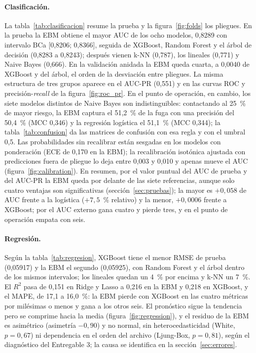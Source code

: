 \paragraph{Clasificación.}
La tabla~\ref{tab:clasificacion} resume la prueba y la figura~\ref{fig:folds} los pliegues. En la prueba la EBM
obtiene el mayor AUC de los ocho modelos, 0,8289 con intervalo BCa [0,8206; 0,8366], seguida de XGBoost,
Random Forest y el árbol de decisión (0,8283 a 0,8243); después vienen k-NN (0,787), los lineales (0,771) y
Naive Bayes (0,666). En la validación anidada la EBM queda cuarta, a 0,0040 de XGBoost y del árbol, el orden
de la desviación entre pliegues. La misma estructura de tres grupos aparece en el AUC-PR (0,551) y en las
curvas ROC y precisión-\emph{recall} de la
figura~\ref{fig:roc_pr}. En el
punto de operación, en cambio, los siete modelos distintos de Naive Bayes son indistinguibles: contactando al
25~\% de mayor riesgo, la EBM captura el 51,2~\% de la fuga con una precisión del 50,4~\% (MCC 0,346) y la
regresión logística el 51,1~\% (MCC 0,344); la tabla~\ref{tab:confusion} da las matrices de confusión con esa
regla y con el umbral 0,5. Las probabilidades sin
recalibrar están sesgadas en los modelos con ponderación (ECE de 0,170 en la EBM); la recalibración isotónica
ajustada con predicciones fuera de pliegue lo deja entre 0,003 y 0,010 y apenas mueve el AUC
(figura~\ref{fig:calibration}). En resumen, por el valor puntual del AUC de prueba y del AUC-PR la EBM queda
por delante de las siete referencias, aunque solo cuatro ventajas son significativas
(sección~\ref{sec:pruebas}); la mayor es $+0{,}058$ de AUC frente a la logística ($+7{,}5$~\% relativo) y la
menor, $+0{,}0006$ frente a XGBoost; por el AUC externo gana cuatro y pierde tres, y en el punto de operación
empata con seis.

\paragraph{Regresión.}
Según la tabla~\ref{tab:regresion}, XGBoost tiene el menor RMSE de prueba (0,05917) y la EBM el segundo
(0,05925), con Random Forest y el árbol dentro de los mismos intervalos; los lineales quedan un 4~\% por encima
y k-NN un 7~\%. El $R^2$ pasa de 0,151 en Ridge y Lasso a 0,216 en la EBM y 0,218 en XGBoost, y el MAPE, de
17,1 a 16,0~\%: la EBM pierde con XGBoost en las cuatro métricas por milésimas o menos y gana a los otros seis.
El pronóstico sigue la tendencia pero
se comprime hacia la media (figura~\ref{fig:regression}), y el residuo de la EBM es asimétrico (asimetría
$-0{,}90$) y no normal, sin heterocedasticidad (White, $p = 0{,}67$) ni dependencia en el orden del archivo
(Ljung-Box, $p = 0{,}81$), según el diagnóstico del Entregable 3; la causa se identifica en la
sección~\ref{sec:errores}.

